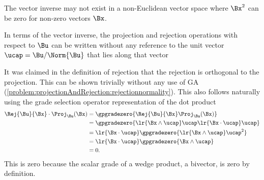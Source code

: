 The vector inverse may not exist in a non-Euclidean vector space where \( \Bx^2 \) can be zero for non-zero vectors \( \Bx \).

In terms of the vector inverse, the projection and rejection operations with respect to \( \Bu \) can be written without any reference to the unit vector \( \ucap = \Bu/\Norm{\Bu} \) that lies along that vector

It was claimed in the definition of rejection that the rejection is orthogonal to the projection.
This can be shown trivially without any use of GA (\cref{problem:projectionAndRejection:rejectionnormality}).
This also follows naturally using the grade selection operator representation of the dot product
\begin{equation}\label{eqn:projectionAndRejection:720}
\begin{aligned}
\Rej{\Bu}{\Bx} \cdot \Proj_\Bu(\Bx)
&= \gpgradezero{ \Rej{\Bu}{\Bx} \Proj_\Bu(\Bx) } \\
&= \gpgradezero{ \lr{ \Bx \wedge \ucap } \ucap \lr{ \Bx \cdot \ucap } \ucap } \\
&= \lr{ \Bx \cdot \ucap } \gpgradezero{ \lr{ \Bx \wedge \ucap } \ucap^2 } \\
&= \lr{ \Bx \cdot \ucap } \gpgradezero{ \Bx \wedge \ucap } \\
&= 0.
\end{aligned}
\end{equation}
This is zero because the scalar grade of a wedge product, a bivector, is zero by definition.

